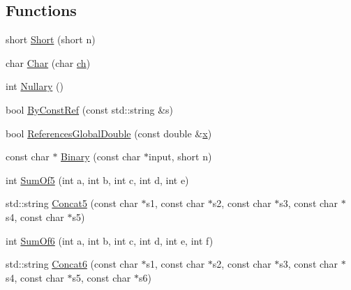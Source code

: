 \subsection*{Functions}
\begin{DoxyCompactItemize}
\item 
short \mbox{\hyperlink{namespacetesting_1_1gmock__generated__actions__test_a7c442b3594b6717b8d499781a82170b2}{Short}} (short n)
\item 
char \mbox{\hyperlink{namespacetesting_1_1gmock__generated__actions__test_aa07e216a4c9d492fb7e7c8fde949bc8f}{Char}} (char \mbox{\hyperlink{_obj__test_2lib_2googletest-master_2googlemock_2test_2gmock-matchers__test_8cc_af53f92900705f7de3c139a05b2f9ef16}{ch}})
\item 
int \mbox{\hyperlink{namespacetesting_1_1gmock__generated__actions__test_acb3d926ebbe88529c38d95f5e61573ef}{Nullary}} ()
\item 
bool \mbox{\hyperlink{namespacetesting_1_1gmock__generated__actions__test_aecf48d9fccd335e231a51013e61b8129}{By\+Const\+Ref}} (const std\+::string \&s)
\item 
bool \mbox{\hyperlink{namespacetesting_1_1gmock__generated__actions__test_a3e552b41de08f0516f4b0e32fed68a61}{References\+Global\+Double}} (const double \&\mbox{\hyperlink{_obj__test_2lib_2googletest-master_2googlemock_2test_2gmock-matchers__test_8cc_a6150e0515f7202e2fb518f7206ed97dc}{x}})
\item 
const char $\ast$ \mbox{\hyperlink{namespacetesting_1_1gmock__generated__actions__test_ac5e6c89b4c4832bd3db18173c40c55ad}{Binary}} (const char $\ast$input, short n)
\item 
int \mbox{\hyperlink{namespacetesting_1_1gmock__generated__actions__test_a7ebfbfdf11d92d4f99df6b659c371e74}{Sum\+Of5}} (int a, int b, int c, int d, int e)
\item 
std\+::string \mbox{\hyperlink{namespacetesting_1_1gmock__generated__actions__test_a5eb28d383a654ddc97e16496753c9e45}{Concat5}} (const char $\ast$s1, const char $\ast$s2, const char $\ast$s3, const char $\ast$s4, const char $\ast$s5)
\item 
int \mbox{\hyperlink{namespacetesting_1_1gmock__generated__actions__test_a3f60acee43510c1603549a1f3bab61ad}{Sum\+Of6}} (int a, int b, int c, int d, int e, int f)
\item 
std\+::string \mbox{\hyperlink{namespacetesting_1_1gmock__generated__actions__test_a396ec2823c0f57354328548dadb56502}{Concat6}} (const char $\ast$s1, const char $\ast$s2, const char $\ast$s3, const char $\ast$s4, const char $\ast$s5, const char $\ast$s6)

\end{DoxyCompactItemize}
